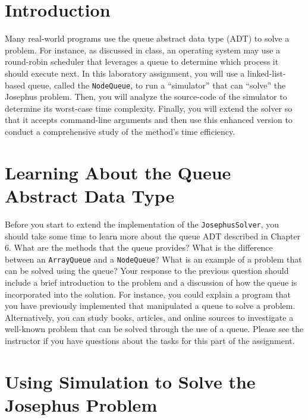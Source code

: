 

\usepackage[compact]{titlesec}


\section*{Introduction}

  Many real-world programs use the queue abstract data type (ADT) to solve a problem. For instance, as discussed in
  class, an operating system may use a round-robin scheduler that leverages a queue to determine which process it should
  execute next. In this laboratory assignment, you will use a linked-list-based queue, called the {\tt NodeQueue}, to
  run a ``simulator'' that can ``solve'' the Josephus problem. Then, you will analyze the source-code of the simulator
  to determine its worst-case time complexity. Finally, you will extend the solver so that it accepts command-line
  arguments and then use this enhanced version to conduct a comprehensive study of the method's time efficiency.

\section*{Learning About the Queue Abstract Data Type}

  Before you start to extend the implementation of the {\tt JosephusSolver}, you should take some time to learn more
  about the queue ADT described in Chapter 6.  What are the methods that the queue provides?  What is the difference
  between an {\tt ArrayQueue} and a {\tt NodeQueue}? What is an example of a problem that can be solved using the queue?
  Your response to the previous question should include a brief introduction to the problem and a discussion of how the
  queue is incorporated into the solution. For instance, you could explain a program that you have previously
  implemented that manipulated a queue to solve a problem.  Alternatively, you can study books, articles, and online
  sources to investigate a well-known problem that can be solved through the use of a queue.  Please see the instructor
  if you have questions about the tasks for this part of the assignment.

\section*{Using Simulation to Solve the Josephus Problem}

